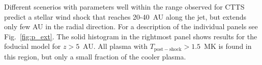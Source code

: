 \label{fig:result}
Different scenerios with parameters well within the range observed for CTTS predict a stellar wind shock that reaches 20-40~AU along the jet, but extends only few AU in the radial direction. For a description of the individual panels see Fig.~\ref{fig:p_ext}. The solid histogram in the rightmost panel shows results for the foducial model for $z>5$~AU. All plasma with $T_{\mathrm{post-shock}}>1.5$~MK is found in this region, but only a small fraction of the cooler plasma.